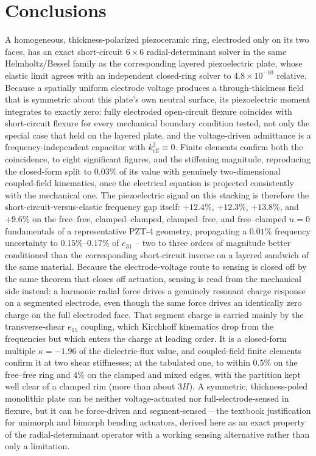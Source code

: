 \documentclass[11pt]{article}
\begin{document}
\section{Conclusions}\label{sec:conc}
A homogeneous, thickness-polarized piezoceramic ring, electroded only on
its two faces, has an exact short-circuit $6\times6$ radial-determinant
solver in the same Helmholtz/Bessel family as the corresponding layered
piezoelectric plate, whose elastic limit agrees with an independent
closed-ring solver to $4.8\times10^{-10}$ relative. Because a spatially
uniform electrode voltage produces a through-thickness field that is
symmetric about this plate's own neutral surface, its piezoelectric
moment integrates to exactly zero: fully electroded open-circuit flexure
coincides with short-circuit flexure for every mechanical boundary
condition tested, not only the special case that held on the layered
plate, and the voltage-driven admittance is a frequency-independent
capacitor with $k_{\mathrm{eff}}^2\equiv0$. Finite elements confirm both
the coincidence, to eight significant figures, and the stiffening
magnitude, reproducing the closed-form split to $0.03\%$ of its value with
genuinely two-dimensional coupled-field kinematics, once the electrical
equation is projected consistently with the mechanical one. The
piezoelectric signal on this stacking is therefore the
short-circuit-versus-elastic frequency gap itself: $+12.4\%$,
$+12.3\%$, $+13.8\%$, and $+9.6\%$ on the free--free,
clamped--clamped, clamped--free, and free--clamped $n=0$ fundamentals of
a representative PZT-4 geometry, propagating a $0.01\%$ frequency
uncertainty to $0.15\%$--$0.17\%$ of $e_{31}$ -- two to three orders of
magnitude better conditioned than the corresponding short-circuit inverse
on a layered sandwich of the same material. Because the electrode-voltage
route to sensing is closed off by the same theorem that closes off
actuation, sensing is read from the mechanical side instead: a harmonic
radial force drives a genuinely resonant charge response on a segmented
electrode, even though the same force drives an identically zero charge
on the full electroded face. That segment charge is carried mainly by
the transverse-shear $e_{15}$ coupling, which Kirchhoff kinematics drop
from the frequencies but which enters the charge at leading order. It is
a closed-form multiple $\kappa=-1.96$ of the dielectric-flux value, and
coupled-field finite elements confirm it at two shear stiffnesses; at
the tabulated one, to within $0.5\%$ on the free--free ring and $4\%$
on the clamped and mixed edges, with the partition kept well clear of a
clamped rim (more than about $3H$). A symmetric, thickness-poled monolithic plate can be
neither voltage-actuated nor full-electrode-sensed in
flexure, but it can be force-driven and segment-sensed -- the textbook
justification for unimorph and bimorph bending actuators, derived here as
an exact property of the radial-determinant operator with a working
sensing alternative rather than only a limitation.
\end{document}
